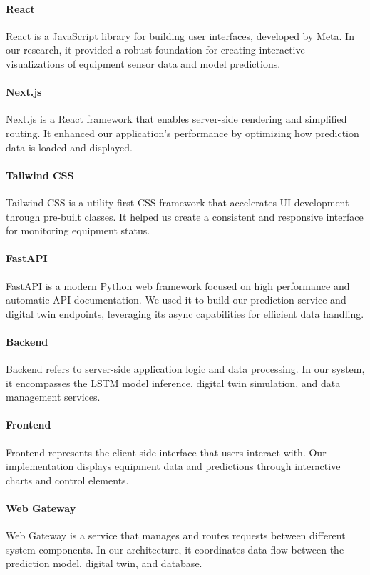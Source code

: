 \paragraph{React} React is a JavaScript library for building user interfaces, developed by Meta. In our research, it provided a robust foundation for creating interactive visualizations of equipment sensor data and model predictions.

\paragraph{Next.js} Next.js is a React framework that enables server-side rendering and simplified routing. It enhanced our application's performance by optimizing how prediction data is loaded and displayed.

\paragraph{Tailwind CSS} Tailwind CSS is a utility-first CSS framework that accelerates UI development through pre-built classes. It helped us create a consistent and responsive interface for monitoring equipment status.

\paragraph{FastAPI} FastAPI is a modern Python web framework focused on high performance and automatic API documentation. We used it to build our prediction service and digital twin endpoints, leveraging its async capabilities for efficient data handling.

\paragraph{Backend} Backend refers to server-side application logic and data processing. In our system, it encompasses the LSTM model inference, digital twin simulation, and data management services.

\paragraph{Frontend} Frontend represents the client-side interface that users interact with. Our implementation displays equipment data and predictions through interactive charts and control elements.

\paragraph{Web Gateway} Web Gateway is a service that manages and routes requests between different system components. In our architecture, it coordinates data flow between the prediction model, digital twin, and database.

